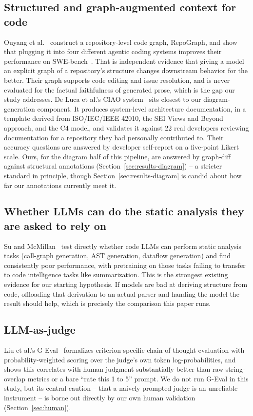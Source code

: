 \documentclass[conference]{IEEEtran}
\begin{document}
\subsection{Structured and graph-augmented context for code}
Ouyang et al.~\cite{ouyang2024repograph} construct a repository-level code graph, RepoGraph, and
show that plugging it into four different agentic coding systems improves their performance on
SWE-bench~\cite{jimenez2024swebench}. That is independent evidence that giving a model an
explicit graph of a repository's structure changes downstream behavior for the better. Their
graph supports code editing and issue resolution, and is never evaluated for the factual
faithfulness of generated prose, which is the gap our study addresses. De Luca et al.'s CIAO
system~\cite{deluca2026ciao} sits closest to our diagram-generation component. It produces
system-level architecture documentation, in a template derived from ISO/IEC/IEEE 42010, the SEI
Views and Beyond approach, and the C4 model, and validates it against 22 real developers
reviewing documentation for a repository they had personally contributed to. Their accuracy
questions are answered by developer self-report on a five-point Likert scale. Ours, for the
diagram half of this pipeline, are answered by graph-diff against structural annotations
(Section~\ref{sec:results-diagram}) -- a stricter standard in principle, though
Section~\ref{sec:results-diagram} is candid about how far our annotations currently meet it.

\subsection{Whether LLMs can do the static analysis they are asked to rely on}
Su and McMillan~\cite{su2025docode} test directly whether code LLMs can perform static analysis
tasks (call-graph generation, AST generation, dataflow generation) and find consistently poor
performance, with pretraining on those tasks failing to transfer to code intelligence tasks
like summarization. This is the strongest existing evidence for our starting hypothesis. If
models are bad at deriving structure from code, offloading that derivation to an actual parser
and handing the model the result should help, which is precisely the comparison this paper runs.

\subsection{LLM-as-judge}
Liu et al.'s G-Eval~\cite{liu2023geval} formalizes criterion-specific chain-of-thought
evaluation with probability-weighted scoring over the judge's own token log-probabilities, and
shows this correlates with human judgment substantially better than raw string-overlap metrics
or a bare ``rate this 1 to 5'' prompt. We do not run G-Eval in this study, but its central
caution -- that a naively prompted judge is an unreliable instrument -- is borne out directly by
our own human validation (Section~\ref{sec:human}).
\end{document}
